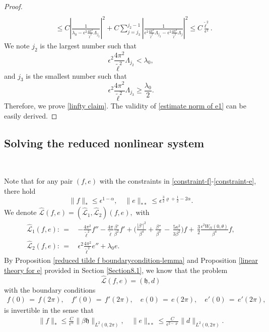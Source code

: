 \documentclass[10pt, reqno]{amsart}
\numberwithin{equation}{section}
\theoremstyle{definition}
\begin{document}
{\begin{proof}
\begin{align*}
\nonumber
\\ & \le C \left|\frac{1} {\lambda_0 - \epsilon^2\frac{4\pi^2}{{\tilde\ell}^2}\Lambda_{j_2}} \right|^2
+ C \sum_{j = j_3}^{j_2-1} \left|\frac{1} {\epsilon^2\frac{4\pi^2}{{\tilde\ell}^2}\Lambda_{j_2} - \epsilon^2\frac{4\pi^2}{{\tilde\ell}^2}\Lambda_j} \right|^2 \le C \frac{\tilde\ell^2} {\epsilon^2}.
\end{align*}
 We note $j_2$ is the largest number such that
$$
\epsilon^2\frac{4\pi^2}{{\tilde\ell}^2}\Lambda_{j_2} < \lambda_0,
$$
and $j_3$ is the smallest number such that
$$
\epsilon^2\frac{4\pi^2}{{\tilde\ell}^2}\Lambda_{j_3} \ge \frac{\lambda_0}2.
$$
Therefore, we prove \eqref{linfty claim}.
The validity of \eqref{estimate norm of e1} can be easily derived.
\end{proof}




\subsection{ Solving the reduced nonlinear system}\label{Section8.2}\

 Note that for any pair $(f, e)$ with the constraints in \eqref{constraint-f}-\eqref{constraint-e}, there hold
$$
 \|f \|_*\leq \epsilon^{1-\alpha}, \quad \|e \|_{**}\leq \epsilon^{\frac 32 \varrho + \frac 12- 2\alpha}.
$$
 We denote $\hat{\mathcal L} (f, e)= \left( \hat {\mathcal L}_1, \hat {\mathcal L}_2 \right) (f, e), $ with
\begin{align*}
 \hat {\mathcal L}_1 (f, e):
\,=\, & - \frac{4\pi^2}{{\tilde\ell}^2}{f}'' - \frac{4\pi}{\tilde\ell} \frac{\beta'}{\beta^2} f'
+ \Big(\frac{|\beta'|^2}{\beta^4}
+\frac{\beta''} {\beta^3}
\,-\,\frac{5\kappa^2}{3\beta^2} \Big) f
+ \, \frac 32\frac{\epsilon^2W_{tt}(0, \theta)}{\beta^4} f,
\nonumber\\[2mm]
\hat {\mathcal L}_2 (f, e):
\,=\, & \epsilon^2\frac{4\pi^2}{{\tilde\ell}^2} e'' + \lambda_0 e.
\end{align*}
By Proposition \ref{reduced tilde f boundarycondition-lemma} and Proposition \ref{linear theory for e} provided in Section \ref{Section8.1}, we know that the problem
\[ \hat {\mathcal L} (f, e) = \left({\mathfrak h}, d\right) \]
with the boundary conditions
\begin{align}
f(0) \,=\, f(2\pi), \quad f'(0) \,=\, f' (2\pi), \quad e(0) \,=\, e(2\pi), \quad e'(0) \,=\, e' (2\pi),
\label{boundaryhatf-e}
\end{align}
is invertible in the sense that
\begin{align}
 \|f\|_* \le \frac{C} {\epsilon^\alpha}\|\beta {\mathfrak h}\|_{L^2(0, 2\pi)}, \quad \|e\|_{**} \le \frac{C}{\epsilon^{2-\varrho}} \|d\|_{L^2(0, 2\pi)}.
\end{align}

}
\end{document}
